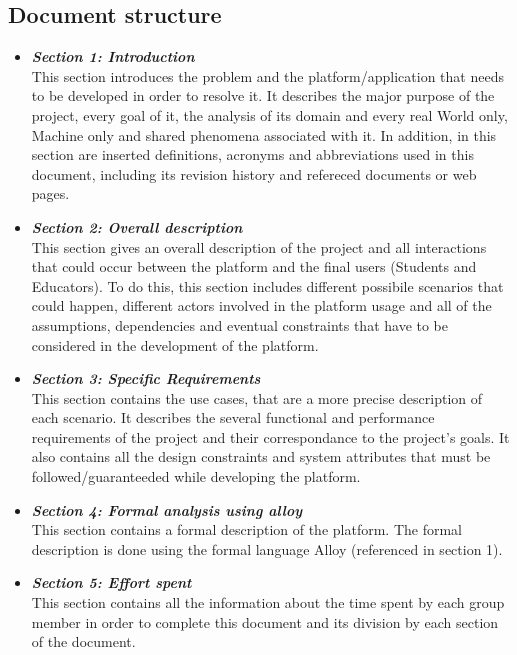\documentclass{article}
\begin{document}
{\subsection{Document structure}
\begin{itemize}
    \item \textbf{\textit{Section 1: Introduction}} \\
          This section introduces the problem and the platform/application that needs to be developed in order to resolve it.
           It describes the major purpose of the project, every goal of it, the analysis of its domain and every 
          real World only, Machine only and shared phenomena associated with it.
          In addition, in this section are inserted definitions, acronyms and abbreviations used in this document, including 
          its revision history and refereced documents or web pages.
    \item \textbf{\textit{Section 2: Overall description}} \\
          This section gives an overall description of the project and all interactions that could occur between the platform 
          and the final users (Students and Educators). To do this, this section includes different possibile scenarios that could happen, 
          different actors involved in the platform usage and all of the assumptions, dependencies and eventual constraints that have 
          to be considered in the development of the platform.
    \item \textbf{\textit{Section 3: Specific Requirements}} \\
          This section contains the use cases, that are a more precise description of each scenario. 
          It describes the several functional and performance requirements of the project and their correspondance to the project's goals.
          It also contains all the design constraints and system attributes that must be followed/guaranteeded while developing the platform.
    \item \textbf{\textit{Section 4: Formal analysis using alloy}} \\
          This section contains a formal description of the platform. The formal description is done using the formal language Alloy 
          (referenced in section 1).
    \item \textbf{\textit{Section 5: Effort spent}} \\
        This section contains all the information about the time spent by each group member in order to complete this document 
          and its division by each section of the document.
\end{itemize}

}
\end{document}

